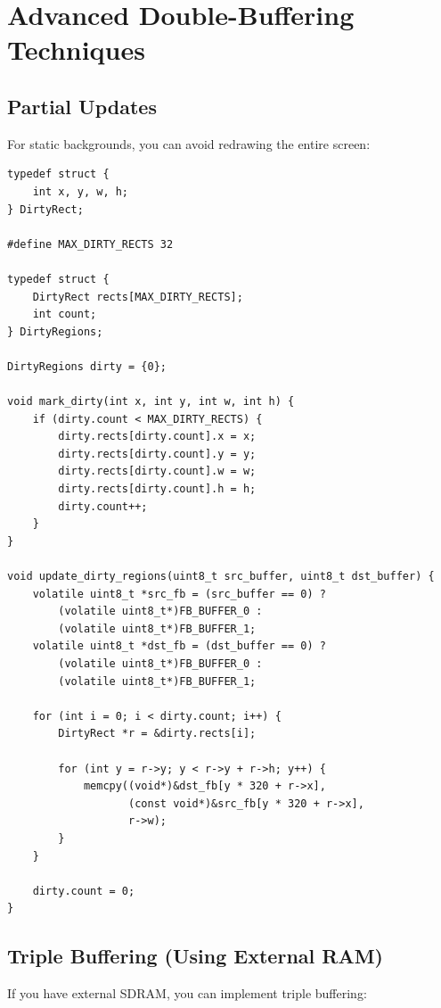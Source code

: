 \documentclass[11pt,letterpaper]{report}
\begin{document}
\section{Advanced Double-Buffering Techniques}

\subsection{Partial Updates}

For static backgrounds, you can avoid redrawing the entire screen:

\begin{lstlisting}[style=c,caption={Partial Screen Updates}]
typedef struct {
    int x, y, w, h;
} DirtyRect;

#define MAX_DIRTY_RECTS 32

typedef struct {
    DirtyRect rects[MAX_DIRTY_RECTS];
    int count;
} DirtyRegions;

DirtyRegions dirty = {0};

void mark_dirty(int x, int y, int w, int h) {
    if (dirty.count < MAX_DIRTY_RECTS) {
        dirty.rects[dirty.count].x = x;
        dirty.rects[dirty.count].y = y;
        dirty.rects[dirty.count].w = w;
        dirty.rects[dirty.count].h = h;
        dirty.count++;
    }
}

void update_dirty_regions(uint8_t src_buffer, uint8_t dst_buffer) {
    volatile uint8_t *src_fb = (src_buffer == 0) ? 
        (volatile uint8_t*)FB_BUFFER_0 : 
        (volatile uint8_t*)FB_BUFFER_1;
    volatile uint8_t *dst_fb = (dst_buffer == 0) ? 
        (volatile uint8_t*)FB_BUFFER_0 : 
        (volatile uint8_t*)FB_BUFFER_1;
    
    for (int i = 0; i < dirty.count; i++) {
        DirtyRect *r = &dirty.rects[i];
        
        for (int y = r->y; y < r->y + r->h; y++) {
            memcpy((void*)&dst_fb[y * 320 + r->x],
                   (const void*)&src_fb[y * 320 + r->x],
                   r->w);
        }
    }
    
    dirty.count = 0;
}
\end{lstlisting}

\subsection{Triple Buffering (Using External RAM)}

If you have external SDRAM, you can implement triple buffering:
\end{document}
